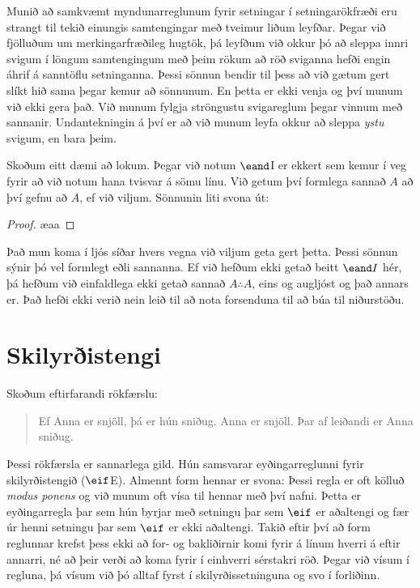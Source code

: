 Munið að samkvæmt myndunarreglunum fyrir setningar í setningarökfræði eru strangt til tekið einungis samtengingar með tveimur liðum leyfðar. Þegar við fjölluðum um merkingarfræðileg hugtök, þá leyfðum við okkur þó að sleppa innri svigum í löngum samtengingum með þeim rökum að röð sviganna hefði engin áhrif á sanntöflu setninganna. Þessi sönnun bendir til þess að við gætum gert slíkt hið sama þegar kemur að sönnunum. En þetta er ekki venja og því munum við ekki gera það. Við munum fylgja ströngustu svigareglum þegar vinnum með sannanir. Undantekningin á því er að við munum leyfa okkur að sleppa \emph{ystu} svigum, en bara þeim.

Skoðum eitt dæmi að lokum. Þegar við notum $\eand$I er ekkert sem kemur í veg fyrir að við notum hana tvisvar á sömu línu. Við getum því formlega sannað $A$ að því gefnu að $A$, ef við viljum. Sönnunin liti svona út:
\begin{proof}
	\ae{aa}
\end{proof} Það mun koma í ljós síðar hvers vegna við viljum geta gert þetta. Þessi sönnun sýnir þó vel formlegt eðli sannanna. Ef við hefðum ekki getað beitt $\eand I$ hér, þá hefðum við einfaldlega ekki getað sannað $A \therefore A$, eins og augljóst og það annars er. Það hefði ekki verið nein leið til að nota forsenduna til að búa til niðurstöðu.

\section{Skilyrðistengi}
Skoðum eftirfarandi rökfærslu:
	\begin{quote}
		Ef Anna er snjöll, þá er hún sniðug. Anna er snjöll. Þar af leiðandi er Anna sniðug.
	\end{quote}
Þessi rökfærsla er sannarlega gild. Hún samsvarar eyðingarreglunni fyrir skilyrðistengið ($\eif$E). Almennt form hennar er svona:
Þessi regla er oft kölluð \emph{modus ponens} og við munum oft vísa til hennar með því nafni. Þetta er eyðingarregla þar sem hún byrjar með setningu þar sem $\eif$ er aðaltengi og fær úr henni setningu þar sem $\eif$ er ekki aðaltengi. Takið eftir því að form reglunnar krefst þess ekki að for- og bakliðirnir komi fyrir á línum hverri á eftir annarri, né að þeir verði að koma fyrir í einhverri sérstakri röð. Þegar við vísum í regluna, þá vísum við þó alltaf fyrst í skilyrðissetninguna og svo í forliðinn.


